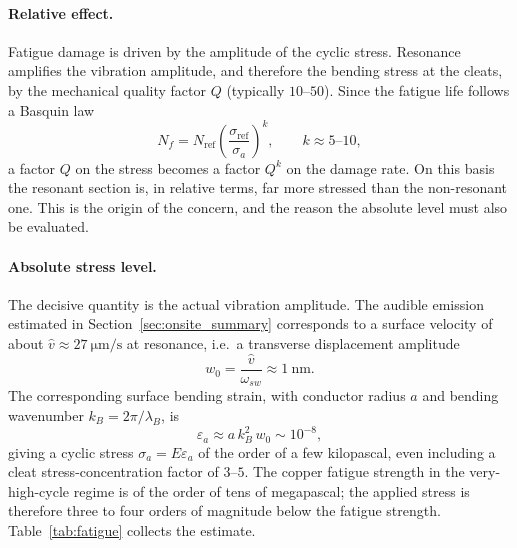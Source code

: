 \documentclass[11pt,a4paper,oneside]{book}
\begin{document}
\begin{onehalfspace}
\begin{appendices}
\paragraph{Relative effect.}
Fatigue damage is driven by the amplitude of the cyclic stress. Resonance amplifies
the vibration amplitude, and therefore the bending stress at the cleats, by the
mechanical quality factor $Q$ (typically $10$--$50$). Since the fatigue life follows
a Basquin law
\begin{equation}
	N_f = N_{\mathrm{ref}}\left(\frac{\sigma_{\mathrm{ref}}}{\sigma_a}\right)^{k},
	\qquad k\approx 5\text{--}10,
	\label{eq:basquin}
\end{equation}
a factor $Q$ on the stress becomes a factor $Q^{k}$ on the damage rate. On this
basis the resonant section is, in relative terms, far more stressed than the
non-resonant one. This is the origin of the concern, and the reason the absolute
level must also be evaluated.

\paragraph{Absolute stress level.}
The decisive quantity is the actual vibration amplitude. The audible emission
estimated in Section~\ref{sec:onsite_summary} corresponds to a surface velocity of
about $\hat v \approx \SI{27}{\micro\meter\per\second}$ at resonance, i.e.\ a
transverse displacement amplitude
\begin{equation}
	w_0 = \frac{\hat v}{\omega_{sw}} \approx \SI{1}{\nano\meter}.
\end{equation}
The corresponding surface bending strain, with conductor radius $a$ and bending
wavenumber $k_B=2\pi/\lambda_B$, is
\begin{equation}
	\varepsilon_a \approx a\,k_B^{2}\,w_0 \sim 10^{-8},
	\label{eq:strain}
\end{equation}
giving a cyclic stress $\sigma_a = E\varepsilon_a$ of the order of a few
kilopascal, even including a cleat stress-concentration factor of $3$--$5$. The
copper fatigue strength in the very-high-cycle regime is of the order of tens of
megapascal; the applied stress is therefore three to four orders of magnitude
below the fatigue strength. Table~\ref{tab:fatigue} collects the estimate.


\end{appendices}
\end{onehalfspace}
\end{document}

